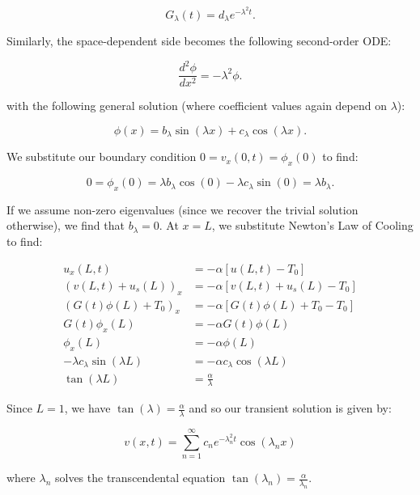 \begin{solution}
    $$
        G_{\lambda}(t) = d_{\lambda}e^{-\lambda^2 t}.
    $$

    Similarly, the space-dependent side becomes the following second-order ODE:

    $$
        \frac{d^2 \phi}{d x^2} = -\lambda^2 \phi.
    $$

    with the following general solution (where coefficient values again depend on $\lambda$):

    $$
        \phi(x) = b_{\lambda} \sin{(\lambda x)} + c_{\lambda} \cos{(\lambda x)}.
    $$

    We substitute our boundary condition $0 = v_x(0, t) = \phi_x(0)$ to find:

    $$
        0 = \phi_x(0) = \lambda b_{\lambda} \cos{(0)} - \lambda c_{\lambda} \sin{(0)} = \lambda b_{\lambda}.
    $$

    If we assume non-zero eigenvalues (since we recover the trivial solution otherwise), we find that $b_{\lambda} = 0$.
    At $x = L$, we substitute Newton's Law of Cooling to find:

    \begin{align*}
        u_x(L, t) &= -\alpha \left[ u(L, t) - T_0 \right] \\
        (v(L, t) + u_s(L))_x &= -\alpha \left[ v(L, t) + u_s(L) - T_0 \right] \\
        (G(t) \phi(L) + T_0)_x &= -\alpha \left[ G(t) \phi(L) + T_0 - T_0 \right] \\
        G(t) \phi_x(L) &= -\alpha G(t) \phi(L) \\
        \phi_x(L) &= -\alpha \phi(L) \\
        -\lambda c_\lambda \sin{(\lambda L)} &= -\alpha c_{\lambda} \cos{(\lambda L)} \\
        \tan{(\lambda L)} &= \frac{\alpha}{\lambda}
    \end{align*}

    Since $L = 1$, we have $\tan{(\lambda)} = \frac{\alpha}{\lambda}$ and so our transient solution is given by:

    \begin{equation}
        v(x, t) = \sum_{n=1}^{\infty}{c_n e^{-\lambda_n^2 t} \cos{(\lambda_n x)}}
    \end{equation}
    
    where $\lambda_n$ solves the transcendental equation $\tan{(\lambda_n)} = \frac{\alpha}{\lambda_n}$.


\end{solution}
